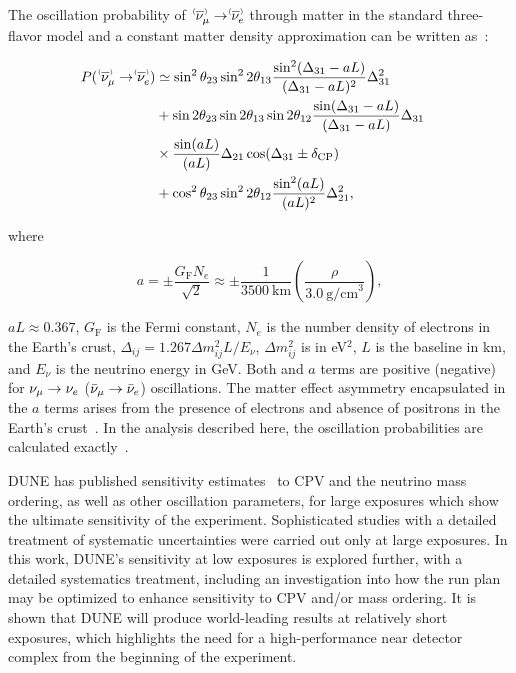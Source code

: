 The oscillation probability of $\;\nu^{\bracketbar}_\mu \rightarrow \nu^{\bracketbar}_e$ through matter in the standard three-flavor model and a constant matter density approximation can be written as~\cite{Nunokawa:2007qh}:
\begin{linenomath*}
  \begin{equation}
    \begin{aligned}
      P(\;\nu^{\bracketbar}_\mu \rightarrow \nu^{\bracketbar}_e) & \simeq \sin^2 \theta_{23} \sin^2 2 \theta_{13} 
      \frac{ \sin^2(\Delta_{31} - aL)}{(\Delta_{31}-aL)^2} \Delta_{31}^2 \\
      & + \sin 2 \theta_{23} \sin 2 \theta_{13} \sin 2 \theta_{12}\frac{ \sin(\Delta_{31} - aL)}{(\Delta_{31}-aL)} \Delta_{31} \\
      &\times \frac{\sin(aL)}{(aL)} \Delta_{21} \cos (\Delta_{31} \pm \deltacp) & \\
      & + \cos^2 \theta_{23} \sin^2 2 \theta_{12} \frac {\sin^2(aL)}{(aL)^2} \Delta_{21}^2,
    \end{aligned}
    \label{eqn:appprob}
  \end{equation}
\end{linenomath*}
where
\begin{linenomath*}
  \begin{equation*}
    a = \pm \frac{G_{\mathrm{F}}N_e}{\sqrt{2}} \approx \pm\frac{1}{3500~\mathrm{km}}\left(\frac{\rho}{3.0~\mathrm{g/cm}^{3}}\right),
  \end{equation*}
\end{linenomath*}
$aL \approx 0.367$, $G_{\mathrm{F}}$ is the Fermi constant, $N_e$ is the number density of electrons in the Earth's crust, $\Delta_{ij} = 1.267 \Delta m^2_{ij} L/E_\nu$, $\Delta m^2_{ij}$ is in eV$^{2}$, $L$ is the baseline in km, and $E_\nu$ is the neutrino energy in GeV.
Both \deltacp and $a$ terms are positive (negative) for $\nu_\mu \to \nu_e$ ($\bar\nu_\mu \to \bar\nu_e$) oscillations. The matter effect asymmetry encapsulated in the $a$ terms arises from the presence of electrons and absence of positrons in the Earth's crust~\cite{Wolfenstein:1977ue,Mikheev:1986gs}. In the analysis described here, the oscillation probabilities are calculated exactly~\cite{Kopp:2006wp}.

DUNE has published sensitivity estimates~\cite{Abi:2020qib} to CPV and the neutrino mass ordering, as well as other oscillation parameters, for large exposures which show the ultimate sensitivity of the experiment. Sophisticated studies with a detailed treatment of systematic uncertainties were carried out only at large exposures. In this work, DUNE's sensitivity at low exposures is explored further, with a detailed systematics treatment, including an investigation into how the run plan may be optimized to enhance sensitivity to CPV and/or mass ordering. It is shown that DUNE will produce world-leading results at relatively short exposures, which highlights the need for a high-performance near detector complex from the beginning of the experiment. 

